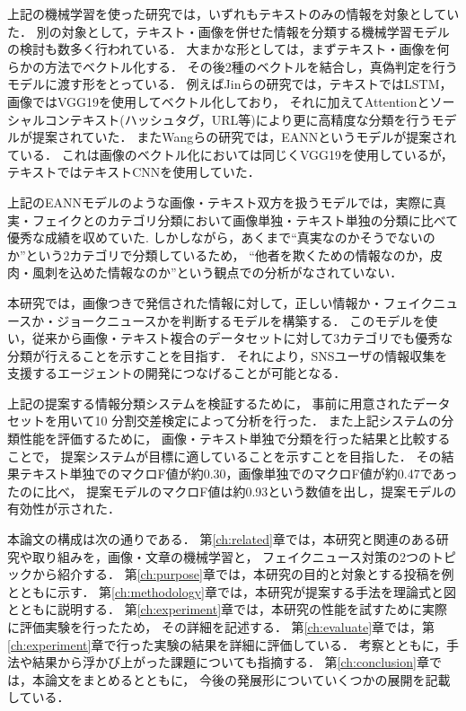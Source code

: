 上記の機械学習を使った研究では，いずれもテキストのみの情報を対象としていた．
別の対象として，テキスト・画像を併せた情報を分類する機械学習モデルの検討も数多く行われている．
大まかな形としては，まずテキスト・画像を何らかの方法でベクトル化する．
その後2種のベクトルを結合し，真偽判定を行うモデルに渡す形をとっている．
例えばJinらの研究\cite{Jin:2017:MFR:3123266.3123454}では，テキストではLSTM，画像ではVGG19を使用してベクトル化しており，
それに加えてAttentionとソーシャルコンテキスト(ハッシュタグ，URL等)により更に高精度な分類を行うモデルが提案されていた．
またWangらの研究\cite{Wang:2018:EEA:3219819.3219903}では，EANNというモデルが提案されている．
これは画像のベクトル化においては同じくVGG19を使用しているが，テキストではテキストCNNを使用していた．

上記のEANNモデルのような画像・テキスト双方を扱うモデルでは，実際に真実・フェイクとのカテゴリ分類において画像単独・テキスト単独の分類に比べて優秀な成績を収めていた\cite{Wang:2018:EEA:3219819.3219903}.\@
しかしながら，あくまで``真実なのかそうでないのか''という2カテゴリで分類しているため，
``他者を欺くための情報なのか，皮肉・風刺を込めた情報なのか''という観点での分析がなされていない．

本研究では，画像つきで発信された情報に対して，正しい情報か・フェイクニュースか・ジョークニュースかを判断するモデルを構築する．
このモデルを使い，従来から画像・テキスト複合のデータセットに対して3カテゴリでも優秀な分類が行えることを示すことを目指す．
それにより，SNSユーザの情報収集を支援するエージェントの開発につなげることが可能となる．

上記の提案する情報分類システムを検証するために，
事前に用意されたデータセットを用いて10 分割交差検定によって分析を行った．
また上記システムの分類性能を評価するために，
画像・テキスト単独で分類を行った結果と比較することで，
提案システムが目標に適していることを示すことを目指した．
その結果テキスト単独でのマクロF値が約0.30，画像単独でのマクロF値が約0.47であったのに比べ，
提案モデルのマクロF値は約0.93という数値を出し，提案モデルの有効性が示された．

本論文の構成は次の通りである．
第\ref{ch:related}章では，本研究と関連のある研究や取り組みを，画像・文章の機械学習と，
フェイクニュース対策の2つのトピックから紹介する．
第\ref{ch:purpose}章では，本研究の目的と対象とする投稿を例とともに示す．
第\ref{ch:methodology}章では，本研究が提案する手法を理論式と図とともに説明する．
第\ref{ch:experiment}章では，本研究の性能を試すために実際に評価実験を行ったため，
その詳細を記述する．
第\ref{ch:evaluate}章では，第\ref{ch:experiment}章で行った実験の結果を詳細に評価している．
考察とともに，手法や結果から浮かび上がった課題についても指摘する．
第\ref{ch:conclusion}章では，本論文をまとめるとともに，
今後の発展形についていくつかの展開を記載している．